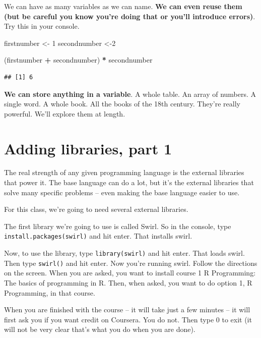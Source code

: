\documentclass[
]{book}
\newenvironment{Shaded}{\begin{snugshade}}{\end{snugshade}}
\newcommand{\DecValTok}[1]{\textcolor[rgb]{0.00,0.00,0.81}{#1}}
\newcommand{\NormalTok}[1]{#1}
\newcommand{\OperatorTok}[1]{\textcolor[rgb]{0.81,0.36,0.00}{\textbf{#1}}}
\newcommand{\StringTok}[1]{\textcolor[rgb]{0.31,0.60,0.02}{#1}}
\begin{document}
We can have as many variables as we can name. \textbf{We can even reuse them (but be careful you know you're doing that or you'll introduce errors)}. Try this in your console.

\begin{Shaded}
\begin{Highlighting}[]
\NormalTok{firstnumber <-}\StringTok{ }\DecValTok{1}
\NormalTok{secondnumber <-}\DecValTok{2} 

\NormalTok{(firstnumber }\OperatorTok{+}\StringTok{ }\NormalTok{secondnumber) }\OperatorTok{*}\StringTok{ }\NormalTok{secondnumber}
\end{Highlighting}
\end{Shaded}

\begin{verbatim}
## [1] 6
\end{verbatim}

\textbf{We can store anything in a variable}. A whole table. An array of numbers. A single word. A whole book. All the books of the 18th century. They're really powerful. We'll explore them at length.

\hypertarget{adding-libraries-part-1}{%
\section{Adding libraries, part 1}\label{adding-libraries-part-1}}

The real strength of any given programming language is the external libraries that power it. The base language can do a lot, but it's the external libraries that solve many specific problems -- even making the base language easier to use.

For this class, we're going to need several external libraries.

The first library we're going to use is called Swirl. So in the console, type \texttt{install.packages(\textquotesingle{}swirl\textquotesingle{})} and hit enter. That installs swirl.

Now, to use the library, type \texttt{library(swirl)} and hit enter. That loads swirl. Then type \texttt{swirl()} and hit enter. Now you're running swirl. Follow the directions on the screen. When you are asked, you want to install course 1 R Programming: The basics of programming in R. Then, when asked, you want to do option 1, R Programming, in that course.

When you are finished with the course -- it will take just a few minutes -- it will first ask you if you want credit on Coursera. You do not. Then type 0 to exit (it will not be very clear that's what you do when you are done).
\end{document}
